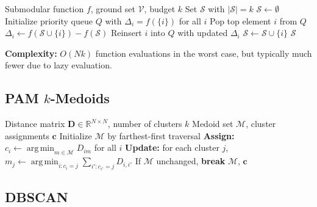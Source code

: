 \documentclass[11pt]{article}
\DeclareMathOperator*{\argmin}{arg\,min}
\begin{document}
\begin{algorithm}[H]
\caption{Lazy Greedy Submodular Maximization~\citep{minoux1978accelerated}}
\label{alg:lazy-greedy}
\begin{algorithmic}[1]
\Require Submodular function $f$, ground set $\mathcal{V}$, budget $k$
\Ensure Set $\mathcal{S}$ with $|\mathcal{S}| = k$
\State $\mathcal{S} \gets \emptyset$
\State Initialize priority queue $Q$ with $\Delta_i = f(\{i\})$ for all $i$
  \Repeat
    \State Pop top element $i$ from $Q$
    \State $\Delta_i \gets f(\mathcal{S} \cup \{i\}) - f(\mathcal{S})$ 
    \State Reinsert $i$ into $Q$ with updated $\Delta_i$
   
  \State $\mathcal{S} \gets \mathcal{S} \cup \{i\}$
\EndFor
\State \Return $\mathcal{S}$
\end{algorithmic}
\end{algorithm}

\textbf{Complexity:} $O(Nk)$ function evaluations in the worst case, but
typically much fewer due to lazy evaluation.

\subsection{PAM $k$-Medoids}

\begin{algorithm}[H]
\caption{$k$-Medoids PAM~\citep{kaufman1990finding}}
\label{alg:kmedoids}
\begin{algorithmic}[1]
\Require Distance matrix $\mathbf{D} \in \mathbb{R}^{N \times N}$, number of clusters $k$
\Ensure Medoid set $\mathcal{M}$, cluster assignments $\mathbf{c}$
\State Initialize $\mathcal{M}$ by farthest-first traversal
\Repeat
  \State \textbf{Assign:} $c_i \gets \argmin_{m \in \mathcal{M}} D_{im}$ for all $i$
  \State \textbf{Update:} for each cluster $j$, $m_j \gets \argmin_{i : c_i = j} \sum_{i' : c_{i'} = j} D_{i,i'}$
  \State If $\mathcal{M}$ unchanged, \textbf{break}
\State \Return $\mathcal{M}$, $\mathbf{c}$
\end{algorithmic}
\end{algorithm}

\subsection{DBSCAN}
\end{document}
